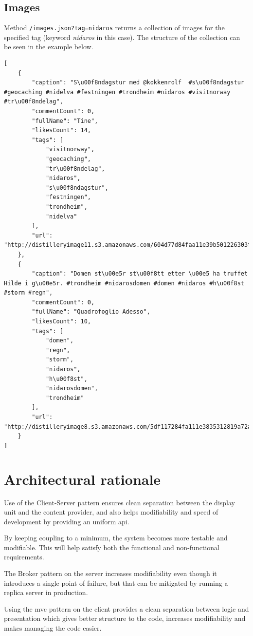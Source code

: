 \documentclass[11pt]{book}
\begin{document}
\subsection{Images}\label{imagesjson}
Method \texttt{/images.json?tag=nidaros} returns a collection of images for the specified tag (keyword \emph{nidaros} in this case). The structure of the collection can be seen in the example below.
\begin{lstlisting}[frame=single]
[
    {
        "caption": "S\u00f8ndagstur med @kokkenrolf  #s\u00f8ndagstur #geocaching #nidelva #festningen #trondheim #nidaros #visitnorway #tr\u00f8ndelag",
        "commentCount": 0,
        "fullName": "Tine",
        "likesCount": 14,
        "tags": [
            "visitnorway",
            "geocaching",
            "tr\u00f8ndelag",
            "nidaros",
            "s\u00f8ndagstur",
            "festningen",
            "trondheim",
            "nidelva"
        ],
        "url": "http://distilleryimage11.s3.amazonaws.com/604d77d84faa11e39b501226303f8d71_8.jpg"
    },
    {
        "caption": "Domen st\u00e5r st\u00f8tt etter \u00e5 ha truffet Hilde i g\u00e5r. #trondheim #nidarosdomen #domen #nidaros #h\u00f8st #storm #regn",
        "commentCount": 0,
        "fullName": "Quadrofoglio Adesso",
        "likesCount": 10,
        "tags": [
            "domen",
            "regn",
            "storm",
            "nidaros",
            "h\u00f8st",
            "nidarosdomen",
            "trondheim"
        ],
        "url": "http://distilleryimage8.s3.amazonaws.com/5df117284fa111e3835312819a72a48f_8.jpg"
    }
]
\end{lstlisting}

\section{Architectural rationale}
Use of the Client-Server pattern ensures clean separation between the display unit and the content provider, and also helps modifiability and speed of development by providing an uniform \gls{api}.

By keeping coupling to a minimum, the system becomes more testable and modifiable. This will help satisfy both the functional and non-functional requirements.

The Broker pattern on the server increases modifiability even though it introduces a single point of failure, but that can be mitigated by running a replica server in production.

Using the \gls{mvc} pattern on the client provides a clean separation between logic and presentation which gives better structure to the code, increases modifiability and makes managing the code easier.
\end{document}
